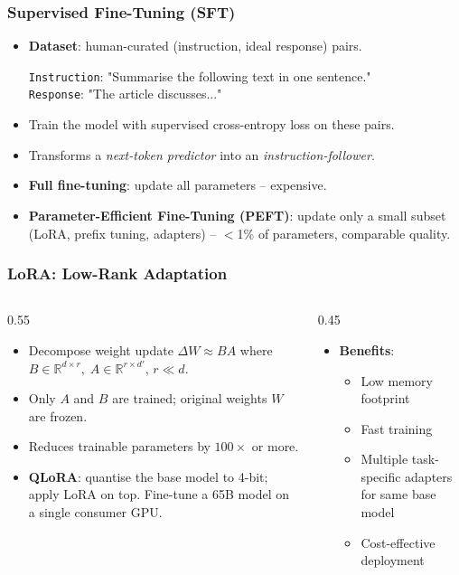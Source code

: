 \begin{frame}[fragile]\frametitle{Supervised Fine-Tuning (SFT)}
\begin{itemize}
\item \textbf{Dataset}: human-curated (instruction, ideal response) pairs.
  \begin{center}
  \texttt{Instruction}: "Summarise the following text in one sentence."\\
  \texttt{Response}: "The article discusses..."
  \end{center}
\item Train the model with supervised cross-entropy loss on these pairs.
\item Transforms a \emph{next-token predictor} into an \emph{instruction-follower}.
\item \textbf{Full fine-tuning}: update all parameters – expensive.
\item \textbf{Parameter-Efficient Fine-Tuning (PEFT)}: update only a small subset (LoRA, prefix tuning, adapters) – $<$1\% of parameters, comparable quality.
\end{itemize}
\end{frame}

\begin{frame}[fragile]\frametitle{LoRA: Low-Rank Adaptation}
\begin{columns}
  \begin{column}[T]{0.55\linewidth}
    \begin{itemize}
    \item Decompose weight update $\Delta W \approx BA$ where $B \in \mathbb{R}^{d \times r},\; A \in \mathbb{R}^{r \times d'}$, $r \ll d$.
    \item Only $A$ and $B$ are trained; original weights $W$ are frozen.
    \item Reduces trainable parameters by $100\times$ or more.
    \item \textbf{QLoRA}: quantise the base model to 4-bit; apply LoRA on top.  Fine-tune a 65B model on a single consumer GPU.
    \end{itemize}
  \end{column}
  \begin{column}[T]{0.45\linewidth}
    \begin{itemize}
    \item \textbf{Benefits}:
      \begin{itemize}
      \item Low memory footprint
      \item Fast training
      \item Multiple task-specific adapters for same base model
      \item Cost-effective deployment
      \end{itemize}
    \end{itemize}
  \end{column}
\end{columns}
\end{frame}

